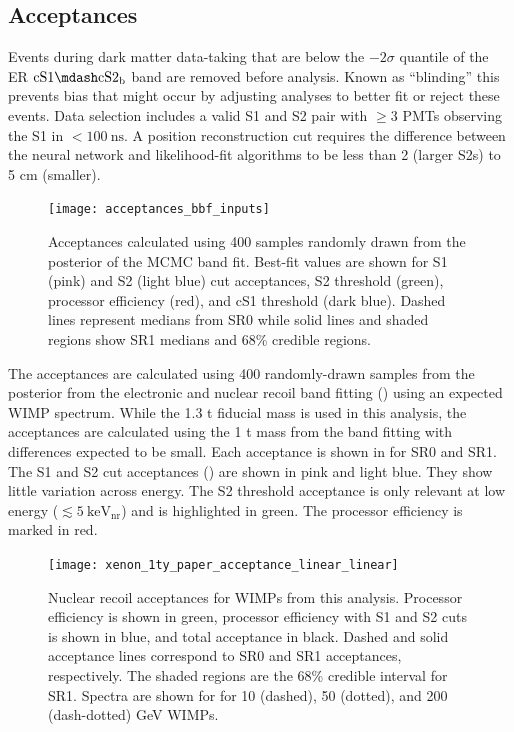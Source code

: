 \subsection{Acceptances}
\label{subsec:dark_matter_results_selection}
Events during dark matter data-taking that are below the $-2 \sigma$ quantile of the ER $\mathrm{cS1} \mdash \mathrm{cS2_b}$ band are
removed before analysis.  Known as ``blinding'' this prevents bias that might occur by adjusting analyses to better fit or reject
these events.  Data selection includes a valid S1 and S2 pair with $\geq 3$ PMTs observing the S1 in $< 100\ \mathrm{ns}$.  A position
reconstruction cut requires the difference between the neural network and likelihood-fit algorithms to be less than 2 (larger S2s) to 5
cm (smaller).

\begin{figure}
\centering
\texttt{[image: acceptances\_bbf\_inputs]}
\caption{Acceptances calculated using 400 samples randomly drawn from the posterior of the MCMC band fit.  Best-fit values are shown for
S1 (pink) and S2 (light blue) cut acceptances, S2 threshold (green), processor efficiency (red), and cS1 threshold
(dark blue).  Dashed lines represent medians from SR0 while solid lines and shaded regions show SR1 medians and 68\% credible regions.}
\label{fig:dark_matter_results_selection_acc_components}
\end{figure}

The acceptances are calculated using 400 randomly-drawn samples from the posterior from the electronic and nuclear recoil band
fitting () using an expected WIMP spectrum.  While the 1.3 t fiducial mass is used in this analysis, the
acceptances are calculated using the 1 t mass from the band fitting with differences expected to be small.  Each acceptance is shown in
 for SR0 and SR1.  The S1 and S2 cut
acceptances () are shown in pink and light blue.  They show little variation
across energy.  The S2 threshold acceptance
is only relevant at low energy ($\lesssim 5\ \mathrm{keV_{nr}}$) and is highlighted in green.  The processor efficiency is marked in
red.

\begin{figure}
\centering
\texttt{[image: xenon\_1ty\_paper\_acceptance\_linear\_linear]}
\caption{Nuclear recoil acceptances for WIMPs from this analysis.  Processor efficiency is shown in green, processor efficiency with S1
and S2 cuts is shown in blue, and total acceptance in black.  Dashed and solid acceptance lines correspond to SR0 and SR1 acceptances,
respectively.  The shaded regions are the 68\% credible interval for SR1.  Spectra are shown for for 10 (dashed), 50 (dotted), and
200 (dash-dotted) GeV WIMPs.}
\label{fig:dark_matter_results_acceptances}
\end{figure}

